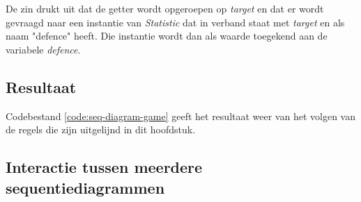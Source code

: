 De zin drukt uit dat de getter wordt opgeroepen op \textit{target} en dat er wordt gevraagd naar een instantie van \textit{Statistic} dat in verband staat met \textit{target} en als naam "defence" heeft. Die instantie wordt dan als waarde toegekend aan de variabele \textit{defence}.

\subsection{Resultaat}

Codebestand \ref{code:seq-diagram-game} geeft het resultaat weer van het volgen van de regels die zijn uitgelijnd in dit hoofdstuk.

\label{code:seq-diagram-game}

\subsection{Interactie tussen meerdere sequentiediagrammen}